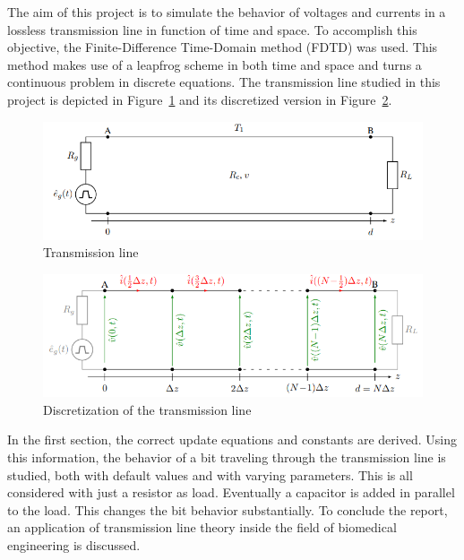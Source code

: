 The aim of this project is to simulate the behavior of voltages and currents in a lossless transmission line in function of time and space. To accomplish this objective, the Finite-Difference Time-Domain method (FDTD) was used. This method makes use of a leapfrog scheme in both time and space and turns a continuous problem in discrete equations. The transmission line studied in this project is depicted in Figure~\ref{fig:TL} and its discretized version in Figure~\ref{fig:TLD}.

\begin{figure}[h!]
    \centering
    \includegraphics[scale=0.75]{figures/TL.png}
    \caption{Transmission line}
    \label{fig:TL}
\end{figure}

\begin{figure}[h!]
    \centering
    \includegraphics[scale=0.75]{figures/TLD.png}
    \caption{Discretization of the transmission line}
    \label{fig:TLD}
\end{figure}

In the first section, the correct update equations and constants are derived. Using this information, the behavior of a bit traveling through the transmission line is studied, both with default values and with varying parameters. This is all considered with just a resistor as load. Eventually a capacitor is added in parallel to the load. This changes the bit behavior substantially. To conclude the report, an application of transmission line theory inside the field of biomedical engineering is discussed.